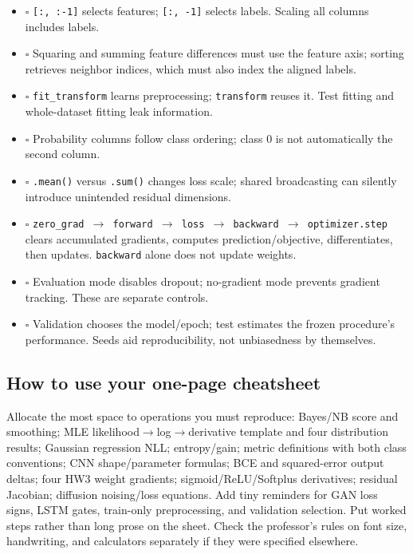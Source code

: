 \documentclass[11pt]{article}
\begin{document}
\begin{itemize}
\item \(\square\) \texttt{[:, :-1]} selects features; \texttt{[:, -1]} selects labels. Scaling all columns includes labels.
\item \(\square\) Squaring and summing feature differences must use the feature axis; sorting retrieves neighbor indices, which must also index the aligned labels.
\item \(\square\) \texttt{fit\_transform} learns preprocessing; \texttt{transform} reuses it. Test fitting and whole-dataset fitting leak information.
\item \(\square\) Probability columns follow class ordering; class 0 is not automatically the second column.
\item \(\square\) \texttt{.mean()} versus \texttt{.sum()} changes loss scale; shared broadcasting can silently introduce unintended residual dimensions.
\item \(\square\) \texttt{zero\_grad \ensuremath{\rightarrow} forward \ensuremath{\rightarrow} loss \ensuremath{\rightarrow} backward \ensuremath{\rightarrow} optimizer.step} clears accumulated gradients, computes prediction/\allowbreak{}objective, differentiates, then updates. \texttt{backward} alone does not update weights.
\item \(\square\) Evaluation mode disables dropout; no-gradient mode prevents gradient tracking. These are separate controls.
\item \(\square\) Validation chooses the model/\allowbreak{}epoch; test estimates the frozen procedure's performance. Seeds aid reproducibility, not unbiasedness by themselves.
\end{itemize}

\subsection*{How to use your one-page cheatsheet}

Allocate the most space to operations you must reproduce: Bayes/\allowbreak{}NB score and smoothing; MLE likelihood\ensuremath{\rightarrow}log\ensuremath{\rightarrow}derivative template and four distribution results; Gaussian regression NLL; entropy/\allowbreak{}gain; metric definitions with both class conventions; CNN shape/\allowbreak{}parameter formulas; BCE and squared-error output deltas; four HW3 weight gradients; sigmoid/\allowbreak{}ReLU/\allowbreak{}Softplus derivatives; residual Jacobian; diffusion noising/\allowbreak{}loss equations. Add tiny reminders for GAN loss signs, LSTM gates, train-only preprocessing, and validation selection. Put worked steps rather than long prose on the sheet. Check the professor's rules on font size, handwriting, and calculators separately if they were specified elsewhere.
\end{document}
